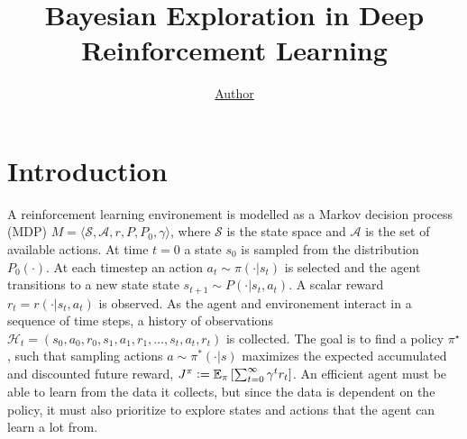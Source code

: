 \documentclass[]{uai2022} %
\title{Bayesian Exploration in Deep Reinforcement Learning}
\author[1]{\href{mailto:<jj@example.edu>?Subject=LALAL}{Author}{}}
\newcommand{\defeq}{\vcentcolon=}
\newcommand{\E}{\mathbb{E}}
\newcommand{\state}{\mathcal{S}}
\newcommand{\action}{\mathcal{A}}
\begin{document}
\maketitle

\begin{abstract}
\end{abstract}


\section{Introduction}
A reinforcement learning environement is modelled as a Markov decision process (MDP)
\(M = \langle \state, \action, r, P, P_0, \gamma \rangle\), where \(\state\) is the
state space and \(\action\) is the set of available actions. At time \(t=0\) a state
\(s_0\) is sampled from the distribution \(P_0(\cdot)\). At each timestep an action
\(a_t \sim \pi(\cdot \vert s_t)\) is selected and the agent transitions to a new state
state \(s_{t+1} \sim P(\cdot \vert s_t, a_t)\). A scalar reward
\(r_t = r(\cdot \vert s_t, a_t)\) is observed. As the agent and environement
interact in a sequence of time steps, a history of observations
\(\mathcal{H}_t = (s_0, a_0, r_0, s_1, a_1, r_1, \dots, s_t, a_t, r_t)\) is collected.
The goal is to find a policy \(\pi^\star\), such that sampling actions
\(a \sim \pi^*(\cdot \vert s)\) maximizes the expected accumulated and discounted future reward,
\(J^\pi \defeq \E_\pi \left[ \sum_{t=0}^\infty \gamma^t r_t \right]\). An efficient
agent must be able to learn from the data it collects, but since the data is
dependent on the policy, it must also prioritize to explore states and actions that
the agent can learn a lot from.
\end{document}
